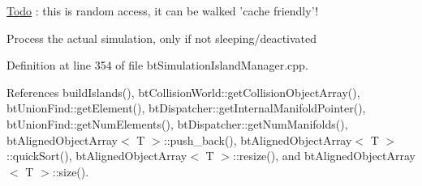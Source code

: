 \begin{Desc}
\item[\hyperlink{todo__todo000017}{Todo}]: this is random access, it can be walked 'cache friendly'! \end{Desc}


Process the actual simulation, only if not sleeping/deactivated 

Definition at line 354 of file btSimulationIslandManager.cpp.

References buildIslands(), btCollisionWorld::getCollisionObjectArray(), btUnionFind::getElement(), btDispatcher::getInternalManifoldPointer(), btUnionFind::getNumElements(), btDispatcher::getNumManifolds(), btAlignedObjectArray$<$ T $>$::push\_\-back(), btAlignedObjectArray$<$ T $>$::quickSort(), btAlignedObjectArray$<$ T $>$::resize(), and btAlignedObjectArray$<$ T $>$::size().

